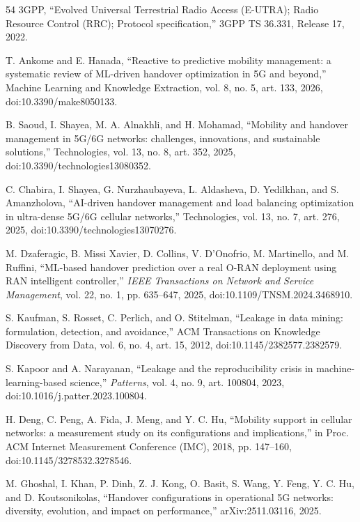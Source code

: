 \begin{thebibliography}{54}
 3GPP, ``Evolved Universal Terrestrial Radio Access (E-UTRA); Radio Resource Control (RRC); Protocol specification,'' 3GPP TS 36.331, Release 17, 2022.

 T. Ankome and E. Hanada, ``Reactive to predictive mobility management: a systematic review of ML-driven handover optimization in 5G and beyond,'' Machine Learning and Knowledge Extraction, vol. 8, no. 5, art. 133, 2026, doi:10.3390/make8050133.

 B. Saoud, I. Shayea, M. A. Alnakhli, and H. Mohamad, ``Mobility and handover management in 5G/6G networks: challenges, innovations, and sustainable solutions,'' Technologies, vol. 13, no. 8, art. 352, 2025, doi:10.3390/technologies13080352.

 C. Chabira, I. Shayea, G. Nurzhaubayeva, L. Aldasheva, D. Yedilkhan, and S. Amanzholova, ``AI-driven handover management and load balancing optimization in ultra-dense 5G/6G cellular networks,'' Technologies, vol. 13, no. 7, art. 276, 2025, doi:10.3390/technologies13070276.

 M. Dzaferagic, B. Missi Xavier, D. Collins, V. D'Onofrio, M. Martinello, and M. Ruffini, ``ML-based handover prediction over a real O-RAN deployment using RAN intelligent controller,'' \textit{IEEE Transactions on Network and Service Management}, vol. 22, no. 1, pp. 635--647, 2025, doi:10.1109/TNSM.2024.3468910.

 S. Kaufman, S. Rosset, C. Perlich, and O. Stitelman, ``Leakage in data mining: formulation, detection, and avoidance,'' ACM Transactions on Knowledge Discovery from Data, vol. 6, no. 4, art. 15, 2012, doi:10.1145/2382577.2382579.

 S. Kapoor and A. Narayanan, ``Leakage and the reproducibility crisis in machine-learning-based science,'' \textit{Patterns}, vol. 4, no. 9, art. 100804, 2023, doi:10.1016/j.patter.2023.100804.

 H. Deng, C. Peng, A. Fida, J. Meng, and Y. C. Hu, ``Mobility support in cellular networks: a measurement study on its configurations and implications,'' in Proc. ACM Internet Measurement Conference (IMC), 2018, pp. 147--160, doi:10.1145/3278532.3278546.

 M. Ghoshal, I. Khan, P. Dinh, Z. J. Kong, O. Basit, S. Wang, Y. Feng, Y. C. Hu, and D. Koutsonikolas, ``Handover configurations in operational 5G networks: diversity, evolution, and impact on performance,'' arXiv:2511.03116, 2025.


\end{thebibliography}
